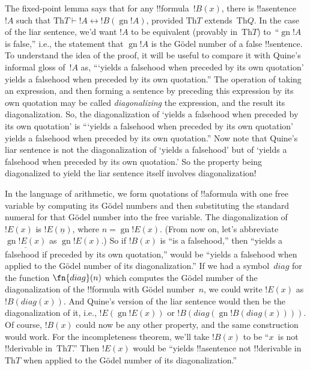 \documentclass[10pt,a4paper]{article}
\theoremstyle{plain}
\theoremstyle{definition}
\theoremstyle{remark}
\newenvironment{explain}{}{}
\providecommand{\Proves}{\mathrel{\vdash}}
\providecommand{\Obj}{}
\providecommand{\Th}{\ensuremath{\mathrm{Th}}}
\providecommand{\num}[1]{\underline{#1}}
\providecommand{\Gn}{\operatorname{gn}}
\providecommand{\gn}{\operatorname{gn}}
\providecommand{\liff}{\mathbin{\leftrightarrow}}
\begin{document}
\begin{explain}
The fixed-point lemma says that for any !!{formula}~$!B(x)$, there is
!!a{sentence}~$!A$ such that $\Th{T} \Proves !A \liff !B(\gn{!A})$,
provided $\Th{T}$ extends~$\Th{Q}$.  In the case of the liar sentence,
we'd want $!A$ to be equivalent (provably in~$\Th{T}$) to~``$\gn{!A}$
is false,'' i.e., the statement that $\Gn{!A}$ is the G\"odel number
of a false !!{sentence}. To understand the idea of the proof, it will
be useful to compare it with Quine's informal gloss of~$!A$ as,
``{}`yields a falsehood when preceded by its own quotation' yields a
falsehood when preceded by its own quotation.''  The operation of
taking an expression, and then forming a sentence by preceding this
expression by its own quotation may be called \emph{diagonalizing} the
expression, and the result its diagonalization. So, the
diagonalization of `yields a falsehood when preceded by its own
quotation' is ``{}`yields a falsehood when preceded by its own
quotation' yields a falsehood when preceded by its own quotation.''
Now note that Quine's liar sentence is not the diagonalization of
`yields a falsehood' but of `yields a falsehood when preceded by its
own quotation.' So the property being diagonalized to yield the liar
sentence itself involves diagonalization!{}

In the language of arithmetic, we form quotations of !!a{formula} with
one free variable by computing its G\"odel numbers and then
substituting the standard numeral for that G\"odel number into the
free variable. The diagonalization of~$!E(x)$ is $!E(\num{n})$, where
$n = \Gn{!E(x)}$. (From now on, let's abbreviate $\num{\Gn{!E(x)}}$ as
$\gn{!E(x)}$.)  So if $!B(x)$ is ``is a falsehood,'' then ``yields a
falsehood if preceded by its own quotation,'' would be ``yields a
falsehood when applied to the G\"odel number of its diagonalization.''
If we had a symbol~$\Obj{diag}$ for the function $\fn{diag}(n)$ which
computes the G\"odel number of the diagonalization of the !!{formula}
with G\"odel number~$n$, we could write $!E(x)$ as
$!B(\Obj{diag}(x))$. And Quine's version of the liar sentence would
then be the diagonalization of it, i.e., $!E(\gn{!E(x)})$ or
$!B(\Obj{diag}(\gn{!B(\Obj{diag}(x))}))$.  Of course, $!B(x)$ could
now be any other property, and the same construction would work. For
the incompleteness theorem, we'll take $!B(x)$ to be ``$x$~is not
!!{derivable} in~$\Th{T}$.'' Then $!E(x)$ would be ``yields
!!a{sentence} not !!{derivable} in~$\Th{T}$ when applied to the
G\"odel number of its diagonalization.''


\end{explain}
\end{document}
